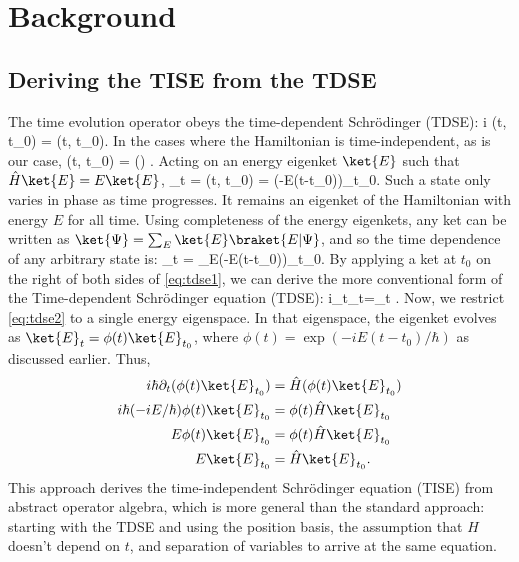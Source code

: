 \section{Background}

\subsection{Deriving the TISE from the TDSE}
The time evolution operator obeys the time-dependent Schr{\"o}dinger (TDSE):
\be 
	i\hbar \; (t, t_0) = (t, t_0)\label{eq:tdse1}.
\ee
In the cases where the Hamiltonian is time-independent, as is our case, 
\be
	(t, t_0) = \exp\left(\right) \label{eq:timeevol}.
\ee
Acting on an energy eigenket $\ket{E}$ such that $\hat{H}\ket{E} = E\ket{E}$, 
\bea
	_t = (t, t_0) = \exp\left(-E(t-t_0)\right)_{t_0}.
\eea
Such a state only varies in phase as time progresses. It remains an eigenket of the Hamiltonian with energy $E$ for all time. Using completeness of the energy eigenkets, any ket can be written as $\ket{\Psi} = \sum_{E}\ket{E}\braket{E|\Psi}$, and so the time dependence of any arbitrary state is:
\bea
	\ket{\Psi}_t = \sum_E\exp\left(-E(t-t_0)\right)_{t_0}.
\eea
By applying a ket at $t_0$ on the right of both sides of \cref{eq:tdse1}, we can derive the more conventional form of the Time-dependent Schr{\"o}dinger equation (TDSE):
\be
	i\hbar\;\partial_t\ket{\Psi}_t=\ket{\Psi}_t \label{eq:tdse2}.
\ee
Now, we restrict \cref{eq:tdse2} to a single energy eigenspace. In that eigenspace, the eigenket evolves as $\ket{E}_t = \phi(t) \ket{E}_{t_0}$, where $\phi(t) =\exp(-iE(t-t_0)/\hbar)$ as discussed earlier. Thus, 
\begin{align*}
	i\hbar \partial_t(\phi(t)\ket{E}_{t_0}) &= \hat{H}(\phi(t)\ket{E}_{t_0}) \\
	i\hbar(-iE/\hbar)\phi(t)\ket{E}_{t_0} &= \phi(t)\hat{H}\ket{E}_{t_0} \\
	E\phi(t)\ket{E}_{t_0} &= \phi(t) \hat{H}\ket{E}_{t_0} \\
	E\ket{E}_{t_0} &= \hat{H}\ket{E}_{t_0}.
\end{align*}
This approach derives the time-independent Schr{\"o}dinger equation (TISE) from abstract operator algebra, which is more general than the standard approach: starting with the TDSE and using the position basis, the assumption that $H$ doesn't depend on $t$, and separation of variables to arrive at the same equation.




